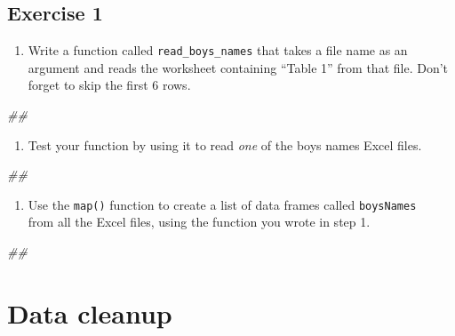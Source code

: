 \documentclass[]{book}
\newenvironment{Shaded}{\begin{snugshade}}{\end{snugshade}}
\newcommand{\CommentTok}[1]{\textcolor[rgb]{0.56,0.35,0.01}{\textit{#1}}}
\providecommand{\tightlist}{%
  \setlength{\itemsep}{0pt}\setlength{\parskip}{0pt}}
\begin{document}
\hypertarget{exercise-1-3}{%
\subsection{Exercise 1}\label{exercise-1-3}}

\begin{enumerate}
\def\labelenumi{\arabic{enumi}.}
\tightlist
\item
  Write a function called \texttt{read\_boys\_names} that takes a file name as an argument
  and reads the worksheet containing ``Table 1'' from that file. Don't forget
  to skip the first 6 rows.
\end{enumerate}

\begin{Shaded}
\begin{Highlighting}[]
\CommentTok{## }
\end{Highlighting}
\end{Shaded}

\begin{enumerate}
\def\labelenumi{\arabic{enumi}.}
\setcounter{enumi}{1}
\tightlist
\item
  Test your function by using it to read \emph{one} of the boys names
  Excel files.
\end{enumerate}

\begin{Shaded}
\begin{Highlighting}[]
\CommentTok{## }
\end{Highlighting}
\end{Shaded}

\begin{enumerate}
\def\labelenumi{\arabic{enumi}.}
\setcounter{enumi}{2}
\tightlist
\item
  Use the \texttt{map()} function to create a list of data frames called \texttt{boysNames}\\
  from all the Excel files, using the function you wrote in step 1.
\end{enumerate}

\begin{Shaded}
\begin{Highlighting}[]
\CommentTok{## }
\end{Highlighting}
\end{Shaded}

\hypertarget{data-cleanup}{%
\section{Data cleanup}\label{data-cleanup}}
\end{document}

